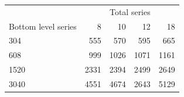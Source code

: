 \documentclass[11pt,a4paper,]{article}
\let\origtable\table
\let\endorigtable\endtable
\renewenvironment{table}[1][2] {
    \expandafter\origtable\expandafter[!htbp]
} {
    \endorigtable
}
\begin{document}
\begin{table}

\caption{\label{tab:TourismsimlevelNS}Total number of the series in the hierarchy structure based on the different number of series with 8, 10, 12 and 18 levels of the hierarchy.}
\centering
\begin{tabular}[t]{lrrrr}
\toprule
\multicolumn{1}{c}{} & \multicolumn{4}{c}{Total series} \\
\cmidrule(l{3pt}r{3pt}){2-5}
Bottom level series & 8 & 10 & 12 & 18\\
\midrule
304 & 555 & 570 & 595 & 665\\
608 & 999 & 1026 & 1071 & 1161\\
1520 & 2331 & 2394 & 2499 & 2649\\
3040 & 4551 & 4674 & 2643 & 5129\\
\bottomrule
\end{tabular}
\end{table}
\end{document}
